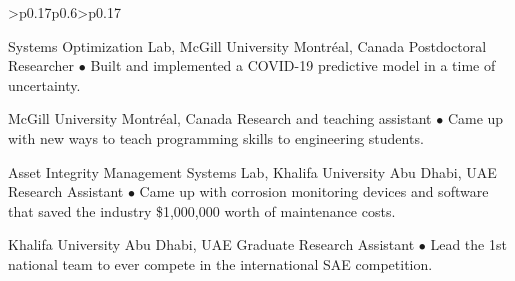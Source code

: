 \documentclass[10pt]{article} %
\begin{document}
\begin{supertabular}{>{\raggedleft\arraybackslash}p{0.17\linewidth}p{0.6\linewidth}>{\raggedleft\arraybackslash}p{0.17\linewidth}} %


	{} %
	{Systems Optimization Lab, McGill University} %
	{Montr\'{e}al, Canada} %
	{Postdoctoral Researcher} %
	{$\bullet$ Built and implemented a COVID-19 predictive model in a time of uncertainty.}{} %



	{} %
	{McGill University} %
	{Montr\'{e}al, Canada} %
	{Research and teaching assistant} %
	{$\bullet$ Came up with new ways to teach programming skills to engineering students.}{}  %

	{} %
	{Asset Integrity Management Systems Lab, Khalifa University} %
	{Abu Dhabi, UAE} %
	{Research Assistant} %
	{$\bullet$ Came up with corrosion monitoring devices and software that saved the industry \$1,000,000 worth of maintenance costs.}{} %


	{} %
	{Khalifa University} %
	{Abu Dhabi, UAE} %
	{Graduate Research Assistant} %
	{$\bullet$ Lead the 1st national team to ever compete in the international SAE competition.}{} %


\end{supertabular}
\end{document}
